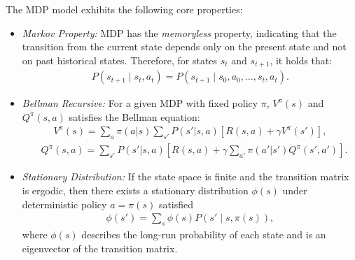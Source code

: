 The MDP model exhibits the following core properties:
\begin{itemize}
    \item \textit{Markov Property:} MDP has the \textit{memoryless} property, indicating that the transition from the current state depends only on the present state and not on past historical states. Therefore, for states $s_t$ and $s_{t+1}$, it holds that:
    \begin{align*}
        P(s_{t+1} \mid s_t, a_t) = P(s_{t+1} \mid s_0, a_0,  \dots, s_{t}, a_t).
    \end{align*}
    
    \item \textit{Bellman Recursive:} For a given MDP with fixed policy \( \pi \), $V^\pi(s)$ and $Q^\pi(s, a)$ satisfies the Bellman equation:
    \begin{align*}
    V^\pi(s) = \sum_a \pi(a|s) \sum_{s'} P(s'|s,a) \left[ R(s,a) + \gamma V^\pi(s') \right],
    \end{align*} 
    {\small\begin{align*}
        & Q^\pi(s,a) 
        = \sum_{s'}  P(s'|s,a)\left[ R(s,a) + \gamma \sum_{a'} \pi(a'|s') Q^\pi(s',a')\right].
    \end{align*}}
    
    \item \textit{Stationary Distribution:} If the state space is finite and the transition matrix is ergodic, then there exists a stationary distribution $\phi(s)$ under deterministic policy $a = \pi(s)$ satisfied
    \begin{align*}
    \phi(s') = \sum_{s} \phi(s) P(s' \mid s, \pi(s)),
    \end{align*}
    where $\phi(s)$ describes the long-run probability of each state and is an eigenvector of the transition matrix.
\end{itemize}

